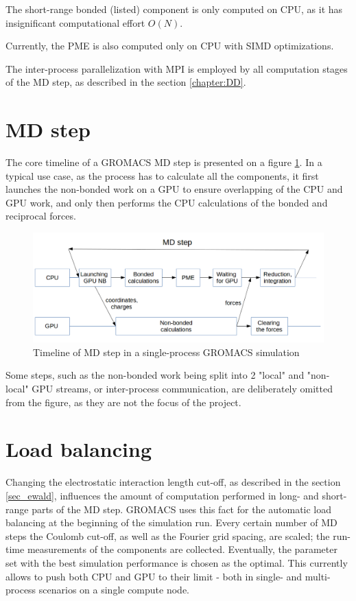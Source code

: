 \documentclass[12pt,a4paper]{report}
\newcommand{\draft}[1]{#1}
\begin{document}
The short-range bonded (listed) component is only computed on CPU, as it has insignificant computational effort $O(N)$.

Currently, the PME is also computed only on CPU with SIMD optimizations. 

The inter-process parallelization with MPI is employed by all computation stages of the MD step, as described in the section \ref{chapter:DD}.

\section{MD step}
\FloatBarrier
The core timeline of a GROMACS MD step is presented on a figure \ref{fig:step-orig}. In a typical use case, as the process has to calculate all the components, it first launches the non-bonded work on a GPU to ensure overlapping of the CPU and GPU work, and only then performs the CPU calculations of the bonded and reciprocal forces. 
\begin{figure}
    \centering
    \includegraphics[width=1\textwidth]{pics/mdstep-orig.png}
    \caption{Timeline of MD step in a single-process GROMACS simulation}
    \label{fig:step-orig}
\end{figure}
\FloatBarrier

Some steps, such as  the non-bonded work being split into 2 "local" and "non-local" GPU streams, or inter-process communication, are deliberately omitted from the figure, as they are not the focus of the project. 


\section{Load balancing} \label{PMEtuning}
Changing the electrostatic interaction length cut-off, as described in the section \ref{sec_ewald}, influences the amount of computation performed in long- and short-range parts of the MD step. GROMACS uses this fact for the automatic load balancing at the beginning of the simulation run. Every certain number of MD steps the Coulomb cut-off, as well as the Fourier grid spacing, are scaled; the run-time measurements of the components are collected. Eventually, the parameter set with the best simulation performance is chosen as the optimal. This currently allows to push both CPU and GPU to their limit - both in single- and multi-process scenarios on a single compute node.
\end{document}
